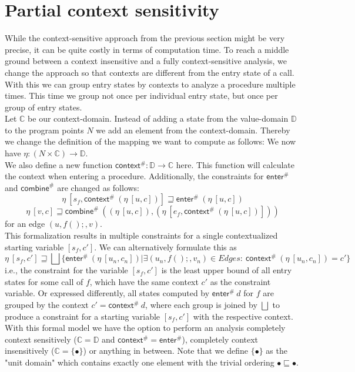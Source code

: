   \section{Partial context sensitivity}\label{sec:partialCtxSens}
    While the context-sensitive approach from the previous section might be very precise, it can be quite costly in terms of computation time. To reach a middle ground between a context insensitive and a fully context-sensitive analysis, we change the approach so that contexts are different from the entry state of a call. With this we can group entry states by contexts to analyze a procedure multiple times. This time we group not once per individual entry state, but once per group of entry states.\\
    Let $\mathbb{C}$ be our context-domain. Instead of adding a state from the value-domain $\mathbb{D}$ to the program points $N$ we add an element from the context-domain. Thereby we change the definition of the mapping we want to compute as follows: We now have $\eta: (N \times \mathbb{C}) \rightarrow \mathbb{D}$.\\
    We also define a new function $\textsf{context}^{\#}: \mathbb{D} \rightarrow \mathbb{C}$ here. This function will calculate the context when entering a procedure. Additionally, the constraints for $\textsf{enter}^{\#}$ and $\textsf{combine}^{\#}$ are changed as follows:
    \[\eta\ [s_f, \textsf{context}^{\#}\ (\eta\ [u, c])] \sqsupseteq \textsf{enter}^{\#}\ (\eta\ [u, c]) \]
    \[\eta\ [v, c] \sqsupseteq \textsf{combine}^{\#}\ ((\eta\ [u, c]), (\eta\ [e_f, \textsf{context}^{\#}\ (\eta\ [u, c])])) \]
    for an edge $(u, f();, v)$.\\
    This formalization results in multiple constraints for a single contextualized starting variable $[s_f, c']$. We can alternatively formulate this as
    \[\eta\ [s_f, c'] \sqsupseteq \bigsqcup \{\textsf{enter}^{\#}\ (\eta\ [u_n, c_n]) | \exists (u_n, f();, v_n) \in Edges:\ \textsf{context}^{\#}\ (\eta\ [u_n, c_n]) = c' \} \]
    i.e., the constraint for the variable $[s_f, c']$ is the least upper bound of all entry states for some call of $f$, which have the same context $c'$ as the constraint variable. Or expressed differently, all states computed by $\textsf{enter}^{\#}\ d$ for $f$ are grouped by the context $c' = \textsf{context}^{\#}\ d$, where each group is joined by $\bigsqcup$ to produce a constraint for a starting variable $[s_f, c']$ with the respective context.\\ 
    With this formal model we have the option to perform an analysis completely context sensitively ($\mathbb{C} = \mathbb{D}$ and $\textsf{context}^{\#} = \textsf{enter}^{\#}$), completely context insensitively ($\mathbb{C} = \{\bullet\}$) or anything in between. Note that we define $\{\bullet\}$ as the "unit domain" which contains exactly one element with the trivial ordering $\bullet \sqsubseteq \bullet$.\\
